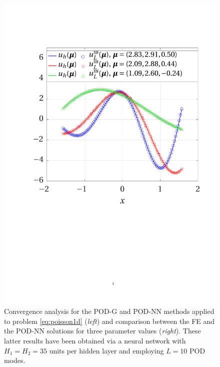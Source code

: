 \documentclass[longtitle]{elsarticle}
\numberwithin{equation}{section}
\theoremstyle{theorem}
\theoremstyle{definition}
\theoremstyle{remark}
\theoremstyle{proposition}
\numberwithin{figure}{section}
\begin{document}
\begin{figure}[b!]
			\includegraphics[scale = 0.385, trim = {1cm 9.5cm 1cm 3.5cm}, clip]{poisson1d_3_fe_vs_podnn_bis}
			
			
			\caption{Convergence analysis for the POD-G and POD-NN methods applied to problem \eqref{eq:poisson1d} (\emph{left}) and comparison between the FE and the POD-NN solutions for three parameter values (\emph{right}). These latter results have been obtained via a neural network with $H_1 = H_2 = 35$ units per hidden layer and employing $L = 10$ POD modes.}
			\label{fig:poisson1d-fig2}
		\end{figure}
				
\end{document}
